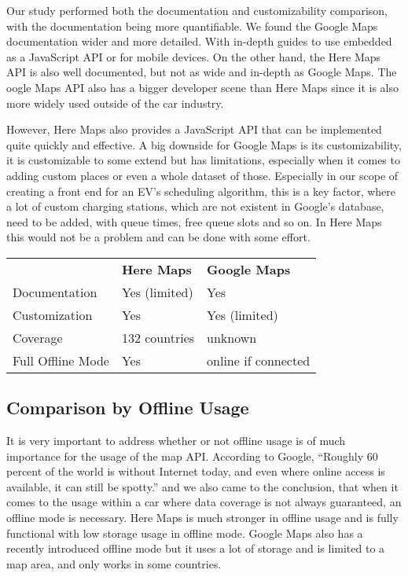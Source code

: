 Our study performed both the documentation and customizability comparison, with the documentation being more quantifiable. We found the Google Maps documentation wider and more detailed. With in-depth guides to use embedded as a JavaScript API or for mobile devices. On the other hand, the Here Maps API is also well documented, but not as wide and in-depth as Google Maps. The oogle Maps API also has a bigger developer scene than Here Maps since it is also more widely used outside of the car industry.

However, Here Maps also provides a JavaScript API that can be implemented quite quickly and effective. A big downside for Google Maps is its customizability, it is customizable to some extend but has limitations, especially when it comes to adding custom places or even a whole dataset of those. Especially in our scope of creating a front end for an EV's scheduling algorithm, this is a key factor, where a lot of custom charging stations, which are not existent in Google's database, need to be added, with queue times, free queue slots and so on. In Here Maps this would not be a problem and can be done with some effort. 


\begin{table}[htp]
\renewcommand{\arraystretch}{1.5}
\begin{tabular}{lll}
 & \textbf{Here Maps} & \textbf{Google Maps} \\
Documentation & Yes (limited) & Yes \\
Customization & Yes & Yes (limited) \\
Coverage & 132 countries & unknown \\
Full Offline Mode & Yes & online if connected
\end{tabular}
\end{table}


\subsection{Comparison by Offline Usage}

It is very important to address whether or not offline usage is of much importance for the usage of the map API. According to Google, ``Roughly 60 percent of the world is without Internet today, and even where online access is available, it can still be spotty.'' \cite{driver-9} and we also came to the conclusion, that when it comes to the usage within a car where data coverage is not always guaranteed, an offline mode is necessary. Here Maps is much stronger in offline usage and is fully functional with low storage usage in offline mode. Google Maps also has a recently introduced offline mode but it uses a lot of storage and is limited to a map area, and only works in some countries. 


